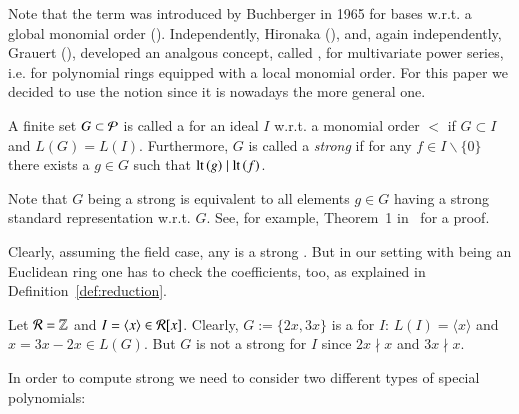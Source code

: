 \begin{convention}
Note that the term \emph{\gb} was introduced by Buchberger in 1965 for bases
w.r.t. a global monomial order (\cite{bGroebner1965, bGroebner1965eng}). Independently, Hironaka
(\cite{hironaka11964, hironaka21964}), and, again
independently, Grauert (\cite{grauert1972}), developed an analgous
concept, called \emph{\stb}, for multivariate power series, i.e. for polynomial
rings equipped with a local monomial order. For this paper we decided to use
the notion \emph{\stb} since it is nowadays the more general one.
\end{convention}

\begin{definition}
\label{def:strong-sb}
A finite set $G \subset \mathcal{P}$ is called a \emph{\stb} for an ideal $I$ w.r.t.
a monomial order $<$ if $G \subset I$ and $L(G) = L(I)$. Furthermore, $G$ is called a
\emph{strong \stb}
   if for any $f \in I\backslash\{0\}$ there exists a $g\in G$
such that $\operatorname{lt}\left({g}\right) \mid \operatorname{lt}\left({f}\right)$. 
\end{definition}

\begin{remark}
Note that $G$ being a strong \stb is equivalent to all elements $g \in G$ having
a strong standard representation w.r.t. $G$. See, for
example, Theorem~1 in~\cite{lichtblau2012} for a proof.
\end{remark}

Clearly, assuming the field case, any \stb is a strong \stb. But in our setting
with \er being an Euclidean ring one has to check the coefficients, too, as
explained in Definition~\ref{def:reduction}.

\begin{example}
\label{ex:stronggb}
Let $\mathcal{R} = \mathbb{Z}$ and $I= \langle x \rangle \in \mathcal{R}[x]$. Clearly, $G :=
\{2x,3x\}$ is a \stb for $I$: $L(I) = \langle x \rangle$ and $x = 3x-2x \in
L(G)$. But $G$ is not a strong \stb for $I$ since $2x \nmid
x$ and $3x \nmid x$.
\end{example}

In order to compute strong \stbs we need to consider two different types of
special polynomials:

